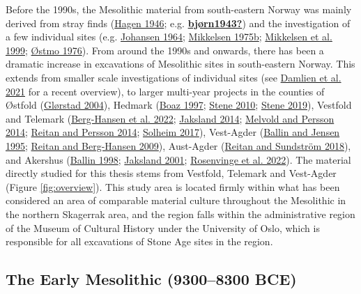 \documentclass[
  12pt,
  a4paper,
  oneside]{book}
\begin{document}
Before the 1990s, the Mesolithic material from south-eastern Norway was mainly derived from stray finds (\protect\hyperlink{ref-hagen1946}{Hagen 1946}; e.g. \protect\hyperlink{ref-bjuxf8rn1943}{\textbf{bjørn1943?}}) and the investigation of a few individual sites (e.g. \protect\hyperlink{ref-johansen1964}{Johansen 1964}; \protect\hyperlink{ref-mikkelsen1975a}{Mikkelsen 1975b}; \protect\hyperlink{ref-mikkelsen1999}{Mikkelsen et al. 1999}; \protect\hyperlink{ref-uxf8stmo1976}{Østmo 1976}). From around the 1990s and onwards, there has been a dramatic increase in excavations of Mesolithic sites in south-eastern Norway. This extends from smaller scale investigations of individual sites (see \protect\hyperlink{ref-damlien2021}{Damlien et al. 2021} for a recent overview), to larger multi-year projects in the counties of Østfold (\protect\hyperlink{ref-gluxf8rstad2004}{Glørstad 2004}), Hedmark (\protect\hyperlink{ref-boaz1997}{Boaz 1997}; \protect\hyperlink{ref-stene2010}{Stene 2010}; \protect\hyperlink{ref-stene2019}{Stene 2019}), Vestfold and Telemark (\protect\hyperlink{ref-berg-hansen2022}{Berg-Hansen et al. 2022}; \protect\hyperlink{ref-jaksland2014}{Jaksland 2014}; \protect\hyperlink{ref-melvold2014b}{Melvold and Persson 2014}; \protect\hyperlink{ref-reitan2014l}{Reitan and Persson 2014}; \protect\hyperlink{ref-solheim2017b}{Solheim 2017}), Vest-Agder (\protect\hyperlink{ref-ballin1995}{Ballin and Jensen 1995}; \protect\hyperlink{ref-reitan2009}{Reitan and Berg-Hansen 2009}), Aust-Agder (\protect\hyperlink{ref-reitan2018c}{Reitan and Sundström 2018}), and Akershus (\protect\hyperlink{ref-ballin1998}{Ballin 1998}; \protect\hyperlink{ref-jaksland2001}{Jaksland 2001}; \protect\hyperlink{ref-rosenvinge2022}{Rosenvinge et al. 2022}). The material directly studied for this thesis stems from Vestfold, Telemark and Vest-Agder (Figure \ref{fig:overview}). This study area is located firmly within what has been considered an area of comparable material culture throughout the Mesolithic in the northern Skagerrak area, and the region falls within the administrative region of the Museum of Cultural History under the University of Oslo, which is responsible for all excavations of Stone Age sites in the region.

\hypertarget{the-early-mesolithic-93008300-bce}{%
\subsection{The Early Mesolithic (9300--8300 BCE)}\label{the-early-mesolithic-93008300-bce}}
\end{document}

